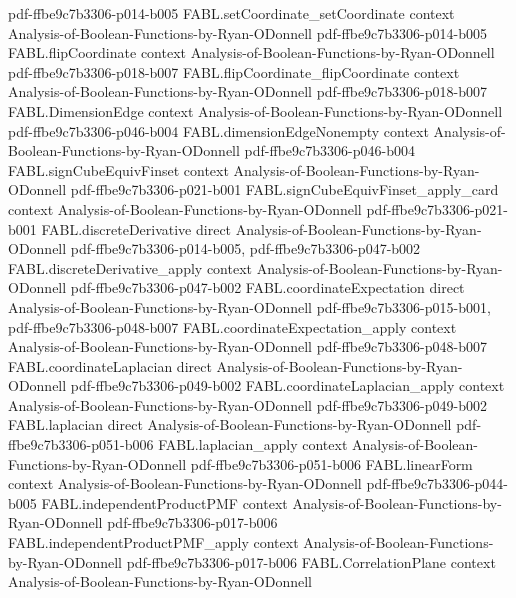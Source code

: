 \begin{theorem}
  {pdf-ffbe9c7b3306-p014-b005}
\proofstep
  {FABL.setCoordinate_setCoordinate}
  {context}
  {Analysis-of-Boolean-Functions-by-Ryan-ODonnell}
  {pdf-ffbe9c7b3306-p014-b005}
\proofstep
  {FABL.flipCoordinate}
  {context}
  {Analysis-of-Boolean-Functions-by-Ryan-ODonnell}
  {pdf-ffbe9c7b3306-p018-b007}
\proofstep
  {FABL.flipCoordinate_flipCoordinate}
  {context}
  {Analysis-of-Boolean-Functions-by-Ryan-ODonnell}
  {pdf-ffbe9c7b3306-p018-b007}
\proofstep
  {FABL.DimensionEdge}
  {context}
  {Analysis-of-Boolean-Functions-by-Ryan-ODonnell}
  {pdf-ffbe9c7b3306-p046-b004}
\proofstep
  {FABL.dimensionEdgeNonempty}
  {context}
  {Analysis-of-Boolean-Functions-by-Ryan-ODonnell}
  {pdf-ffbe9c7b3306-p046-b004}
\proofstep
  {FABL.signCubeEquivFinset}
  {context}
  {Analysis-of-Boolean-Functions-by-Ryan-ODonnell}
  {pdf-ffbe9c7b3306-p021-b001}
\proofstep
  {FABL.signCubeEquivFinset_apply_card}
  {context}
  {Analysis-of-Boolean-Functions-by-Ryan-ODonnell}
  {pdf-ffbe9c7b3306-p021-b001}
\proofstep
  {FABL.discreteDerivative}
  {direct}
  {Analysis-of-Boolean-Functions-by-Ryan-ODonnell}
  {pdf-ffbe9c7b3306-p014-b005,
    pdf-ffbe9c7b3306-p047-b002}
\proofstep
  {FABL.discreteDerivative_apply}
  {context}
  {Analysis-of-Boolean-Functions-by-Ryan-ODonnell}
  {pdf-ffbe9c7b3306-p047-b002}
\proofstep
  {FABL.coordinateExpectation}
  {direct}
  {Analysis-of-Boolean-Functions-by-Ryan-ODonnell}
  {pdf-ffbe9c7b3306-p015-b001,
    pdf-ffbe9c7b3306-p048-b007}
\proofstep
  {FABL.coordinateExpectation_apply}
  {context}
  {Analysis-of-Boolean-Functions-by-Ryan-ODonnell}
  {pdf-ffbe9c7b3306-p048-b007}
\proofstep
  {FABL.coordinateLaplacian}
  {direct}
  {Analysis-of-Boolean-Functions-by-Ryan-ODonnell}
  {pdf-ffbe9c7b3306-p049-b002}
\proofstep
  {FABL.coordinateLaplacian_apply}
  {context}
  {Analysis-of-Boolean-Functions-by-Ryan-ODonnell}
  {pdf-ffbe9c7b3306-p049-b002}
\proofstep
  {FABL.laplacian}
  {direct}
  {Analysis-of-Boolean-Functions-by-Ryan-ODonnell}
  {pdf-ffbe9c7b3306-p051-b006}
\proofstep
  {FABL.laplacian_apply}
  {context}
  {Analysis-of-Boolean-Functions-by-Ryan-ODonnell}
  {pdf-ffbe9c7b3306-p051-b006}
\proofstep
  {FABL.linearForm}
  {context}
  {Analysis-of-Boolean-Functions-by-Ryan-ODonnell}
  {pdf-ffbe9c7b3306-p044-b005}
\proofstep
  {FABL.independentProductPMF}
  {context}
  {Analysis-of-Boolean-Functions-by-Ryan-ODonnell}
  {pdf-ffbe9c7b3306-p017-b006}
\proofstep
  {FABL.independentProductPMF_apply}
  {context}
  {Analysis-of-Boolean-Functions-by-Ryan-ODonnell}
  {pdf-ffbe9c7b3306-p017-b006}
\proofstep
  {FABL.CorrelationPlane}
  {context}
  {Analysis-of-Boolean-Functions-by-Ryan-ODonnell}

\end{theorem}
